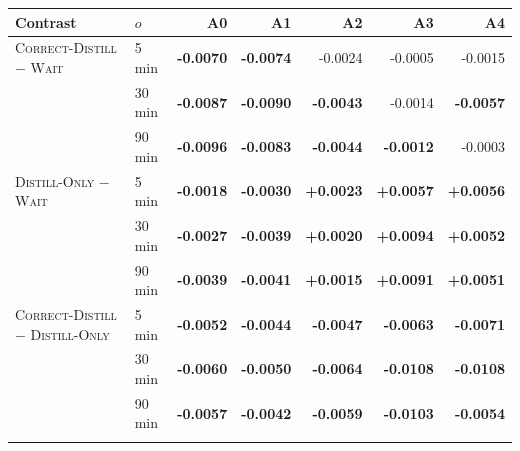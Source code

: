 \begin{tabular}{@{}llrrrrr@{}}
\toprule
Contrast & $o$ & A0 & A1 & A2 & A3 & A4\\
\midrule
\textsc{Correct-Distill} $-$ \textsc{Wait} & 5\,min & \textbf{-0.0070} & \textbf{-0.0074} & -0.0024 & -0.0005 & -0.0015\\
 & 30\,min & \textbf{-0.0087} & \textbf{-0.0090} & \textbf{-0.0043} & -0.0014 & \textbf{-0.0057}\\
 & 90\,min & \textbf{-0.0096} & \textbf{-0.0083} & \textbf{-0.0044} & \textbf{-0.0012} & -0.0003\\
\addlinespace
\textsc{Distill-Only} $-$ \textsc{Wait} & 5\,min & \textbf{-0.0018} & \textbf{-0.0030} & \textbf{+0.0023} & \textbf{+0.0057} & \textbf{+0.0056}\\
 & 30\,min & \textbf{-0.0027} & \textbf{-0.0039} & \textbf{+0.0020} & \textbf{+0.0094} & \textbf{+0.0052}\\
 & 90\,min & \textbf{-0.0039} & \textbf{-0.0041} & \textbf{+0.0015} & \textbf{+0.0091} & \textbf{+0.0051}\\
\addlinespace
\textsc{Correct-Distill} $-$ \textsc{Distill-Only} & 5\,min & \textbf{-0.0052} & \textbf{-0.0044} & \textbf{-0.0047} & \textbf{-0.0063} & \textbf{-0.0071}\\
 & 30\,min & \textbf{-0.0060} & \textbf{-0.0050} & \textbf{-0.0064} & \textbf{-0.0108} & \textbf{-0.0108}\\
 & 90\,min & \textbf{-0.0057} & \textbf{-0.0042} & \textbf{-0.0059} & \textbf{-0.0103} & \textbf{-0.0054}\\
\addlinespace
\bottomrule
\end{tabular}
